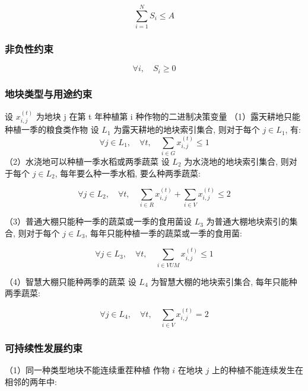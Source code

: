 \documentclass[12pt]{ctexart}
\begin{document}
\begin{equation}
	\sum_{i=1}^N S_i \leq A
\end{equation}
	\subsubsection{非负性约束}
	\begin{equation}
	\forall i, \quad S_i \geq 0
\end{equation}
	\subsubsection{地块类型与用途约束}
	
	设 $x_{i, j}^{(t)}$ 为地块 j 在第 t 年种植第 i 种作物的二进制决策变量
	\newline
	（1）露天耕地只能种植一季的粮食类作物
	设 $L_1$ 为露天耕地的地块索引集合, 则对于每个 $j \in L_1$, 有:
	\begin{equation}\forall j \in L_1, \quad \forall t, \quad \sum_{i \in G} x_{i, j}^{(t)} \leq 1\end{equation}
	（2）水浇地可以种植一季水稻或两季蔬菜
	设 $L_2$ 为水浇地的地块索引集合, 则对于每个 $j \in L_2$, 每年要么种一季水稻, 要么种两季蔬菜:
	
\begin{equation}
	\forall j \in L_2, \quad \forall t, \quad \sum_{i \in R} x_{i, j}^{(t)}+\sum_{i \in V} x_{i, j}^{(t)} \leq 2
\end{equation}
	
	（3）普通大棚只能种一季的蔬菜或一季的食用菌设 $L_3$ 为普通大棚地块索引的集合, 则对于每个 $j \in L_3$, 每年只能种植一季的蔬菜或一季的食用菌:
	
\begin{equation}
	\forall j \in L_3, \quad \forall t, \quad \sum_{i \in V U M} x_{i, j}^{(t)} \leq 1
\end{equation}
	
	（4）智慧大棚只能种两季的蔬菜
	设 $L_4$ 为智慧大棚的地块索引集合, 每年只能种两季蔬菜:
	
\begin{equation}
	\forall j \in L_4, \quad \forall t, \quad \sum_{i \in V} x_{i, j}^{(t)}=2
\end{equation}
	\subsubsection{可持续性发展约束}
	（1）同一种类型地块不能连续重茬种植
	作物 $i$ 在地块 $j$ 上的种植不能连续发生在相邻的两年中:
	
\end{document}
